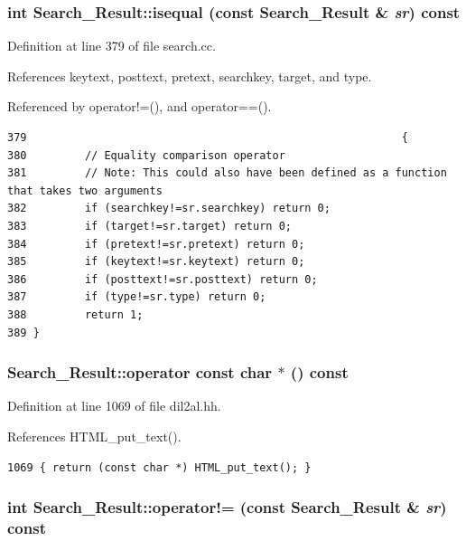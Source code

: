 \subsubsection{\setlength{\rightskip}{0pt plus 5cm}int Search\_\-Result::isequal (const Search\_\-Result \& {\em sr}) const}\label{classSearch__Result_a2}




Definition at line 379 of file search.cc.

References keytext, posttext, pretext, searchkey, target, and type.

Referenced by operator!=(), and operator==().



\footnotesize\begin{verbatim}379                                                          {
380         // Equality comparison operator
381         // Note: This could also have been defined as a function that takes two arguments
382         if (searchkey!=sr.searchkey) return 0;
383         if (target!=sr.target) return 0;
384         if (pretext!=sr.pretext) return 0;
385         if (keytext!=sr.keytext) return 0;
386         if (posttext!=sr.posttext) return 0;
387         if (type!=sr.type) return 0;
388         return 1;
389 }
\end{verbatim}\normalsize 
{}
\subsubsection{\setlength{\rightskip}{0pt plus 5cm}Search\_\-Result::operator const char $\ast$ () const\hspace{0.3cm}{\tt  [inline]}}\label{classSearch__Result_a6}




Definition at line 1069 of file dil2al.hh.

References HTML\_\-put\_\-text().



\footnotesize\begin{verbatim}1069 { return (const char *) HTML_put_text(); }
\end{verbatim}\normalsize 
{}
\subsubsection{\setlength{\rightskip}{0pt plus 5cm}int Search\_\-Result::operator!= (const Search\_\-Result \& {\em sr}) const\hspace{0.3cm}{\tt  [inline]}}\label{classSearch__Result_a4}




